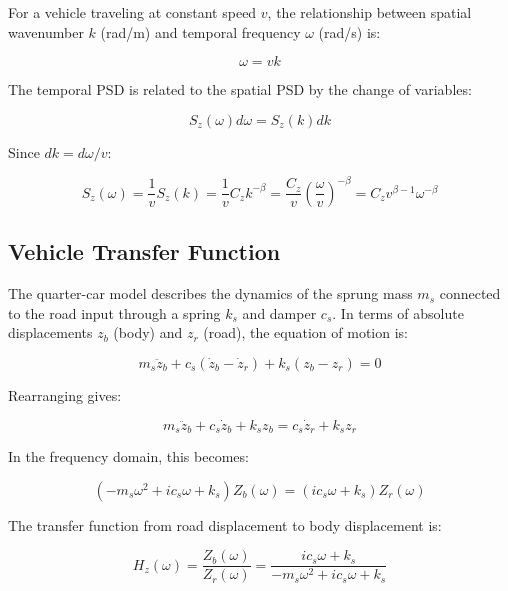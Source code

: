 \documentclass[11pt]{article}
\begin{document}
For a vehicle traveling at constant speed $v$, the relationship between spatial wavenumber $k$ (rad/m) and temporal frequency $\omega$ (rad/s) is:

\begin{equation}
\omega = vk
\end{equation}

The temporal PSD is related to the spatial PSD by the change of variables:

\begin{equation}
S_z(\omega) d\omega = S_z(k) dk
\end{equation}

Since $dk = d\omega/v$:

\begin{equation}
S_z(\omega) = \frac{1}{v} S_z(k) = \frac{1}{v} C_z k^{-\beta} = \frac{C_z}{v} \left(\frac{\omega}{v}\right)^{-\beta} = C_z v^{\beta-1} \omega^{-\beta}
\end{equation}


\subsection{Vehicle Transfer Function}

The quarter-car model describes the dynamics of the sprung mass $m_s$ connected to the road input through a spring $k_s$ and damper $c_s$. In terms of absolute displacements $z_b$ (body) and $z_r$ (road), the equation of motion is:

$$m_s \ddot{z}_b + c_s(\dot{z}_b - \dot{z}_r) + k_s(z_b - z_r) = 0$$

Rearranging gives:

\begin{equation}
m_s \ddot{z}_b + c_s \dot{z}_b + k_s z_b = c_s \dot{z}_r + k_s z_r
\end{equation}

In the frequency domain, this becomes:

\begin{equation}
(-m_s \omega^2 + i c_s \omega + k_s) Z_b(\omega) = (i c_s \omega + k_s) Z_r(\omega)
\end{equation}

The transfer function from road displacement to body displacement is:

\begin{equation}
H_z(\omega) = \frac{Z_b(\omega)}{Z_r(\omega)} = \frac{i c_s \omega + k_s}{-m_s \omega^2 + i c_s \omega + k_s}
\end{equation}
\end{document}
